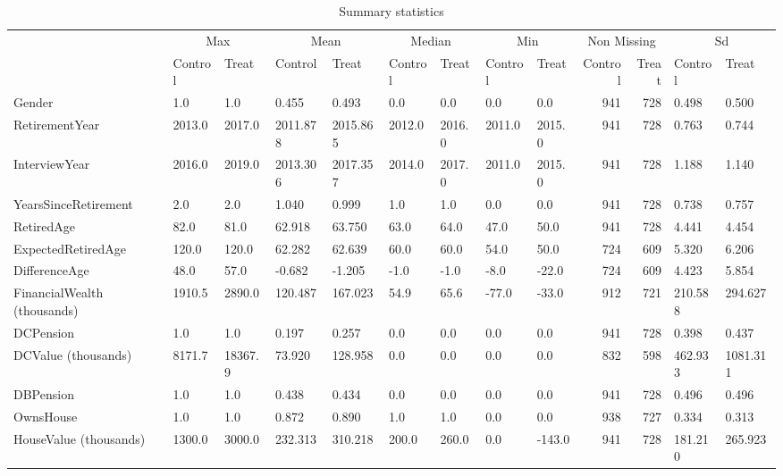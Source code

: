 \begin{table}

\caption{Summary statistics \label{tab:sum_stats}}
\centering
\begin{tabular}[t]{lllllllllrrll}
\toprule
\multicolumn{1}{c}{ } & \multicolumn{2}{c}{Max} & \multicolumn{2}{c}{Mean} & \multicolumn{2}{c}{Median} & \multicolumn{2}{c}{Min} & \multicolumn{2}{c}{Non Missing} & \multicolumn{2}{c}{Sd} \\
\cmidrule(l{3pt}r{3pt}){2-3} \cmidrule(l{3pt}r{3pt}){4-5} \cmidrule(l{3pt}r{3pt}){6-7} \cmidrule(l{3pt}r{3pt}){8-9} \cmidrule(l{3pt}r{3pt}){10-11} \cmidrule(l{3pt}r{3pt}){12-13}
 & Control & Treat & Control & Treat & Control & Treat & Control & Treat & Control & Treat & Control & Treat\\
\midrule
Gender & 1.0 & 1.0 & 0.455 & 0.493 & 0.0 & 0.0 & 0.0 & 0.0 & 941 & 728 & 0.498 & 0.500\\
RetirementYear & 2013.0 & 2017.0 & 2011.878 & 2015.865 & 2012.0 & 2016.0 & 2011.0 & 2015.0 & 941 & 728 & 0.763 & 0.744\\
InterviewYear & 2016.0 & 2019.0 & 2013.306 & 2017.357 & 2014.0 & 2017.0 & 2011.0 & 2015.0 & 941 & 728 & 1.188 & 1.140\\
YearsSinceRetirement & 2.0 & 2.0 & 1.040 & 0.999 & 1.0 & 1.0 & 0.0 & 0.0 & 941 & 728 & 0.738 & 0.757\\
RetiredAge & 82.0 & 81.0 & 62.918 & 63.750 & 63.0 & 64.0 & 47.0 & 50.0 & 941 & 728 & 4.441 & 4.454\\
\addlinespace
ExpectedRetiredAge & 120.0 & 120.0 & 62.282 & 62.639 & 60.0 & 60.0 & 54.0 & 50.0 & 724 & 609 & 5.320 & 6.206\\
DifferenceAge & 48.0 & 57.0 & -0.682 & -1.205 & -1.0 & -1.0 & -8.0 & -22.0 & 724 & 609 & 4.423 & 5.854\\
FinancialWealth (thousands) & 1910.5 & 2890.0 & 120.487 & 167.023 & 54.9 & 65.6 & -77.0 & -33.0 & 912 & 721 & 210.588 & 294.627\\
DCPension & 1.0 & 1.0 & 0.197 & 0.257 & 0.0 & 0.0 & 0.0 & 0.0 & 941 & 728 & 0.398 & 0.437\\
DCValue (thousands) & 8171.7 & 18367.9 & 73.920 & 128.958 & 0.0 & 0.0 & 0.0 & 0.0 & 832 & 598 & 462.933 & 1081.311\\
\addlinespace
DBPension & 1.0 & 1.0 & 0.438 & 0.434 & 0.0 & 0.0 & 0.0 & 0.0 & 941 & 728 & 0.496 & 0.496\\
OwnsHouse & 1.0 & 1.0 & 0.872 & 0.890 & 1.0 & 1.0 & 0.0 & 0.0 & 938 & 727 & 0.334 & 0.313\\
HouseValue (thousands) & 1300.0 & 3000.0 & 232.313 & 310.218 & 200.0 & 260.0 & 0.0 & -143.0 & 941 & 728 & 181.210 & 265.923\\

\end{tabular}
\end{table}
